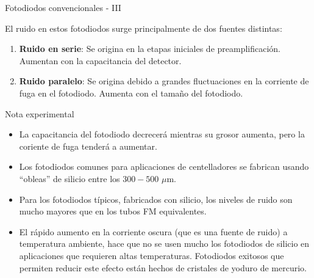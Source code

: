 \documentclass[a4paper,10pt]{beamer}
\begin{document}
\begin{frame}{Fotodiodos convencionales - III}
 
 El ruido en estos fotodiodos surge principalmente de dos fuentes distintas:
 
 \begin{enumerate}
  \item \begin{justify}
	  \textbf{Ruido en serie}: Se origina en la etapas iniciales de 
	  preamplificación. Aumentan con la capacitancia del detector.
	\end{justify}
  \item \begin{justify}
         \textbf{Ruido paralelo}: Se origina debido a grandes fluctuaciones en 
         la corriente de fuga en el fotodiodo. Aumenta con el tamaño del fotodiodo.
        \end{justify}
 \end{enumerate}
 
 \begin{exampleblock}{Nota experimental}
  \begin{itemize}[<+->]
   \item \begin{justify}
          La capacitancia del fotodiodo decrecerá mientras su grosor aumenta, pero 
          la coriente de fuga tenderá a aumentar.
         \end{justify}
   \item \begin{justify}
          Los fotodiodos comunes para aplicaciones de centelladores se fabrican usando 
          ``obleas'' de silicio entre los $300-500$ $\mu$m.
         \end{justify}
   \item \begin{justify}
          Para los fotodiodos típicos, fabricados con silicio, los niveles de ruido 
          son mucho mayores que en los tubos FM equivalentes.
         \end{justify}      
   \item \begin{justify}
          El rápido aumento en la corriente oscura (que es una fuente de ruido) 
          a temperatura ambiente, hace que no se usen mucho los fotodiodos de silicio
          en aplicaciones que requieren altas temperaturas. Fotodiodos exitosos 
          que permiten reducir este efecto están hechos de cristales de yoduro de 
          mercurio.
         \end{justify}
  \end{itemize}

 \end{exampleblock}

\end{frame}
\end{document}
